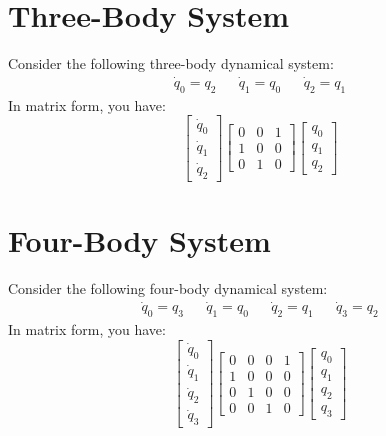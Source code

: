 \section{Three-Body System}
Consider the following three-body dynamical system:
\begin{align}
    \dot{q}_{0} = q_{2} && \dot{q}_{1} = q_{0} && \dot{q}_{2} = q_{1}
\end{align}
In matrix form, you have:
\begin{equation}
    \begin{bmatrix}
        \dot{q}_{0} \\ \dot{q}_{1} \\ \dot{q}_{2}
    \end{bmatrix} \begin{bmatrix}
        0 & 0 & 1 \\
        1 & 0 & 0 \\
        0 & 1 & 0
    \end{bmatrix} \begin{bmatrix}
        q_{0} \\ q_{1} \\ q_{2}
    \end{bmatrix}
\end{equation}
\section{Four-Body System}
Consider the following four-body dynamical system:
\begin{align}
    \dot{q}_{0} = q_{3} && \dot{q}_{1} = q_{0} && \dot{q}_{2} = q_{1} && \dot{q}_{3} = q_{2}
\end{align}
In matrix form, you have:
\begin{equation}
    \begin{bmatrix}
        \dot{q}_{0} \\ \dot{q}_{1} \\ \dot{q}_{2} \\ \dot{q}_{3}
    \end{bmatrix} \begin{bmatrix}
        0 & 0 & 0 & 1 \\
        1 & 0 & 0 & 0 \\
        0 & 1 & 0 & 0 \\
        0 & 0 & 1 & 0
    \end{bmatrix} \begin{bmatrix}
        q_{0} \\ q_{1} \\ q_{2} \\ q_{3}
    \end{bmatrix}
\end{equation}
